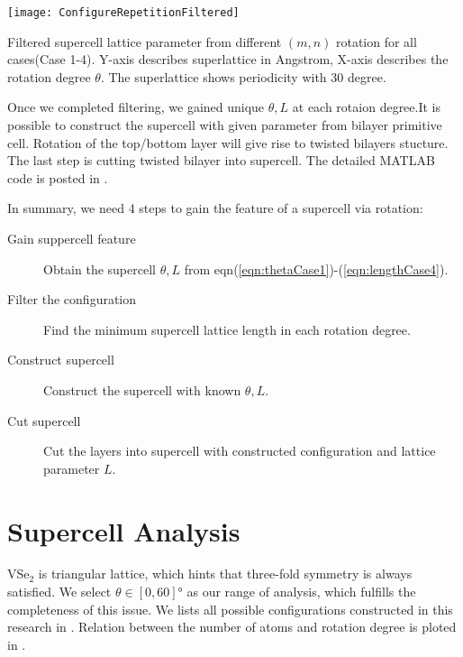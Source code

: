 \begin{marginfigure}[]
	\texttt{[image: ConfigureRepetitionFiltered]}
	\caption[Filtered supercell lattice parameter from different $(m,n)$ rotation for all cases(Case 1-4).]{
		Filtered supercell lattice parameter from different $(m,n)$ rotation for all cases(Case 1-4). Y-axis describes superlattice in Angstrom, X-axis describes the rotation degree $\theta$. The superlattice shows periodicity with 30 degree.
	}
\end{marginfigure}

Once we completed filtering, we gained unique $\theta, L$ at each rotaion degree.It is possible to construct the supercell with given parameter from bilayer primitive cell. Rotation of the top/bottom layer will give rise to twisted bilayers stucture. The last step is cutting twisted bilayer into supercell. The detailed MATLAB code is posted in .

In summary, we need 4 steps to gain the feature of a supercell via rotation:
\begin{description}
	\item[Gain suppercell feature] Obtain the supercell $\theta, L$ from eqn(\ref{eqn:thetaCase1})-(\ref{eqn:lengthCase4}).
	\item[Filter the configuration] Find the minimum supercell lattice length in each rotation degree.
	\item[Construct supercell] Construct the supercell with known $\theta, L$.
	\item[Cut supercell] Cut the layers into supercell with constructed configuration and lattice parameter $L$.
\end{description}

\section{Supercell Analysis}

VSe$_2$ is triangular lattice, which hints that three-fold symmetry is always satisfied. We select $\theta \in [0, 60]$° as our range of analysis, which fulfills the completeness of this issue. We lists all possible configurations constructed in this research in . Relation between the number of atoms and rotation degree is ploted in .

